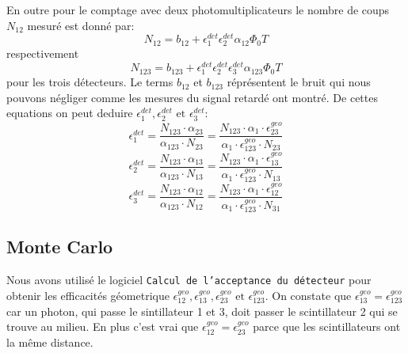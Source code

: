 \documentclass[a4paper,11pt,liststotocnumbered,bibtotocnumbered]{scrartcl}
\begin{document}
En outre pour le comptage avec deux photomultiplicateurs le nombre de coups $N_{12}$ mesuré est donné par:
\begin{equation*}
N_{12}=b_{12}+\epsilon_{1}^{det} \epsilon_{2}^{det}\alpha_{12}\Phi_0 T
\end{equation*}
respectivement
\begin{equation*}
N_{123}=b_{123}+\epsilon_{1}^{det} \epsilon_{2}^{det}\epsilon_{3}^{det}\alpha_{123}\Phi_0 T
\end{equation*}
pour les trois détecteurs. Le terms $b_{12}$ et $b_{123}$ réprésentent le bruit qui nous pouvons négliger comme les mesures du signal retardé ont montré. De cettes equations on peut deduire $\epsilon_{1}^{det},\epsilon_{2}^{det}\text{ et }\epsilon_{3}^{det}$:
\begin{equation*}
\epsilon_{1}^{det}=\frac{N_{123} \cdot \alpha_{23}}{\alpha_{123}\cdot N_{23}}=\frac{N_{123} \cdot \alpha_{1}\cdot \epsilon_{23}^{geo}}{\alpha_{1}\cdot \epsilon_{123}^{geo}\cdot N_{23}}
\end{equation*}
\begin{equation*}
\epsilon_{2}^{det}=\frac{N_{123} \cdot \alpha_{13}}{\alpha_{123}\cdot N_{13}}=\frac{N_{123} \cdot \alpha_{1}\cdot \epsilon_{13}^{geo}}{\alpha_{1}\cdot \epsilon_{123}^{geo}\cdot N_{13}}
\end{equation*}
\begin{equation*}
\epsilon_{3}^{det}=\frac{N_{123} \cdot \alpha_{12}}{\alpha_{123}\cdot N_{12}}=\frac{N_{123} \cdot \alpha_{1}\cdot \epsilon_{12}^{geo}}{\alpha_{1}\cdot \epsilon_{123}^{geo}\cdot N_{31}}
\end{equation*}


  \subsection{Monte Carlo}
   Nous avons utilisé le logiciel \texttt{Calcul de l'acceptance du détecteur} pour obtenir les efficacités géometrique $\epsilon_{12}^{geo},\epsilon_{13}^{geo}, \epsilon_{23}^{geo}\text{ et }\epsilon_{123}^{geo}$. On constate que $\epsilon_{13}^{geo}=\epsilon_{123}^{geo}$ car un photon, qui passe le sintillateur 1 et 3, doit passer le scintillateur 2 qui se trouve au milieu. En plus c'est vrai que  $\epsilon_{12}^{geo}=\epsilon_{23}^{geo}$ parce que les scintillateurs ont la même distance.
\end{document}
